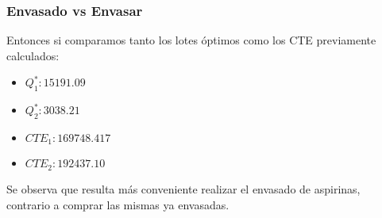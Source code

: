 \begin{homeworkProblem}
\subsubsection{Envasado vs Envasar}
Entonces si comparamos tanto los lotes óptimos como los CTE previamente calculados:
\begin{itemize}
    \item $Q^*_1:15191.09$
    \item $Q^*_2:3038.21$
    \item $CTE_1:169748.417$
    \item $CTE_2:192437.10$
\end{itemize}
Se observa que resulta más conveniente realizar el envasado de aspirinas, contrario a comprar las mismas ya envasadas.
\end{homeworkProblem}